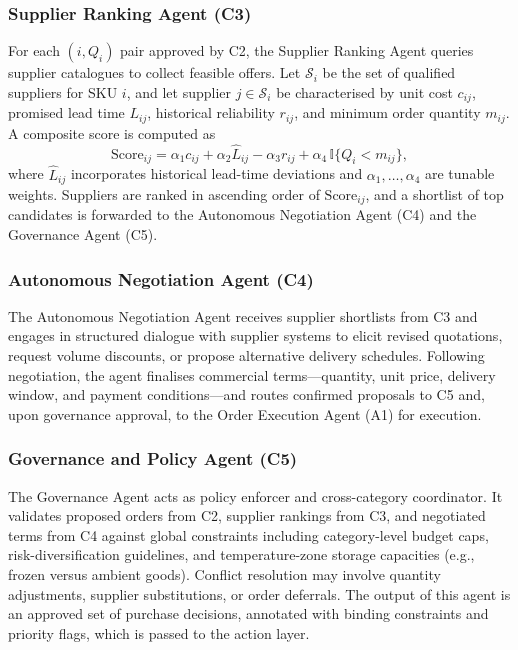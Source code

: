\documentclass[utf8]{FrontiersinHarvard}
\begin{document}
	\subsubsection{Supplier Ranking Agent (C3)}

	For each $(i, Q_i)$ pair approved by C2, the Supplier Ranking Agent
	queries supplier catalogues to collect feasible offers.  Let
	$\mathcal{S}_i$ be the set of qualified suppliers for SKU $i$, and let
	supplier $j \in \mathcal{S}_i$ be characterised by unit cost $c_{ij}$,
	promised lead time $L_{ij}$, historical reliability $r_{ij}$, and minimum
	order quantity $m_{ij}$.  A composite score is computed as
	\begin{equation}
		\label{eq:supplier}
		\text{Score}_{ij} =
		\alpha_1 c_{ij}
		+ \alpha_2 \hat{L}_{ij}
		- \alpha_3 r_{ij}
		+ \alpha_4\,\mathbb{I}\{Q_i < m_{ij}\},
	\end{equation}
	where $\hat{L}_{ij}$ incorporates historical lead-time deviations and
	$\alpha_1,\dots,\alpha_4$ are tunable weights.  Suppliers are ranked in
	ascending order of $\text{Score}_{ij}$, and a shortlist of top candidates
	is forwarded to the Autonomous Negotiation Agent (C4) and the Governance
	Agent (C5).

	\subsubsection{Autonomous Negotiation Agent (C4)}

	The Autonomous Negotiation Agent receives supplier shortlists from C3
	and engages in structured dialogue with supplier systems to elicit revised
	quotations, request volume discounts, or propose alternative delivery
	schedules.  Following negotiation, the agent finalises commercial
	terms---quantity, unit price, delivery window, and payment conditions---and
	routes confirmed proposals to C5 and, upon governance approval, to the
	Order Execution Agent (A1) for execution.

	\subsubsection{Governance and Policy Agent (C5)}

	The Governance Agent acts as policy enforcer and cross-category coordinator.
	It validates proposed orders from C2, supplier rankings from C3, and
	negotiated terms from C4 against global constraints including category-level
	budget caps, risk-diversification guidelines, and temperature-zone storage
	capacities (e.g., frozen versus ambient goods).  Conflict resolution may
	involve quantity adjustments, supplier substitutions, or order deferrals.
	The output of this agent is an approved set of purchase decisions, annotated
	with binding constraints and priority flags, which is passed to the action
	layer.
\end{document}
